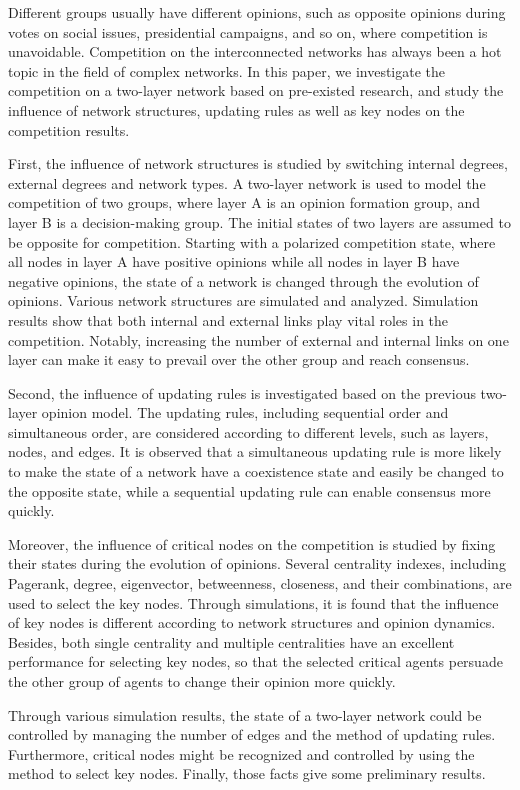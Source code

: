 \begin{englishabstract}
	
Different groups usually have different opinions, such as opposite opinions during votes on social issues, presidential campaigns, and so on, where competition is unavoidable. Competition on the interconnected networks has always been a hot topic in the field of complex networks. In this paper, we investigate the competition on a two-layer network based on pre-existed research, and study the influence of network structures, updating rules as well as key nodes on the competition results.

First, the influence of network structures is studied by switching internal degrees, external degrees and network types. A two-layer network is used to model the competition of two groups, where layer A is an opinion formation group, and layer B is a decision-making group. The initial states of two layers are assumed to be opposite for competition. Starting with a polarized competition state, where all nodes in layer A have positive opinions while all nodes in layer B have negative opinions, the state of a network is changed through the evolution of opinions. Various network structures are simulated and analyzed. Simulation results show that both internal and external links play vital roles in the competition. Notably, increasing the number of external and internal links on one layer can make it easy to prevail over the other group and reach consensus.

Second, the influence of updating rules is investigated based on the previous two-layer opinion model. The updating rules, including sequential order and simultaneous order, are considered according to different levels, such as layers, nodes, and edges. It is observed that a simultaneous updating rule is more likely to make the state of a network have a coexistence state and easily be changed to the opposite state, while a sequential updating rule can enable consensus more quickly.

Moreover, the influence of critical nodes on the competition is studied by fixing their states during the evolution of opinions. Several centrality indexes, including Pagerank, degree, eigenvector, betweenness, closeness, and their combinations, are used to select the key nodes. Through simulations, it is found that the influence of key nodes is different according to network structures and opinion dynamics. Besides, both single centrality and multiple centralities have an excellent performance for selecting key nodes, so that the selected critical agents persuade the other group of agents to change their opinion more quickly.

Through various simulation results, the state of a two-layer network could be controlled by managing the number of edges and the method of updating rules. Furthermore, critical nodes might be recognized and controlled by using the method to select key nodes. Finally, those facts give some preliminary results.\\ 

\end{englishabstract}


